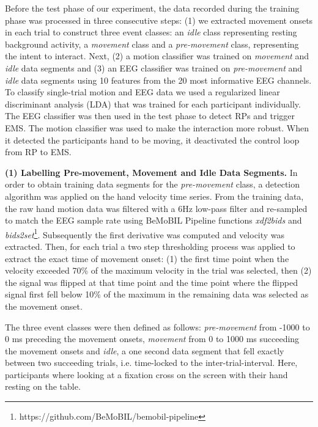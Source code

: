 Before the test phase of our experiment, the data recorded during the training phase was processed in three consecutive steps: (1) we extracted movement onsets in each trial to construct three event classes: an \textit{idle} class representing resting background activity, a \textit{movement} class and a \textit{pre-movement} class, representing the intent to interact. Next, (2) a motion classifier was trained on \textit{movement} and \textit{idle} data segments and (3) an EEG classifier was trained on \textit{pre-movement} and \textit{idle} data segments using 10 features from the 20 most informative EEG channels. To classify single-trial motion and EEG data we used a regularized linear discriminant analysis (LDA) that was trained for each participant individually. The EEG classifier was then used in the test phase to detect RPs and trigger EMS. The motion classifier was used to make the interaction more robust. When it detected the participants hand to be moving, it deactivated the control loop from RP to EMS.


\indent\textbf{(1) Labelling Pre-movement, Movement and Idle Data Segments.}
In order to obtain training data segments for the \textit{pre-movement} class, a detection algorithm was applied on the hand velocity time series. From the training data, the raw hand motion data was filtered with a 6Hz low-pass filter and re-sampled to match the EEG sample rate using BeMoBIL Pipeline functions \textit{xdf2bids} and \textit{bids2set}\footnote{https://github.com/BeMoBIL/bemobil-pipeline}. Subsequently the first derivative was computed and velocity was extracted. Then, for each trial a two step thresholding process was applied to extract the exact time of movement onset: (1) the first time point when the velocity exceeded 70\% of the maximum velocity in the trial was selected, then (2) the signal was flipped at that time point and the time point where the flipped signal first fell below 10\% of the maximum in the remaining data was selected as the movement onset.

The three event classes were then defined as follows: \textit{pre-movement} from -1000 to 0 ms preceding the movement onsets, \textit{movement} from 0 to 1000 ms succeeding the movement onsets and \textit{idle}, a one second data segment that fell exactly between two succeeding trials, i.e. time-locked to the inter-trial-interval. Here, participants where looking at a fixation cross on the screen with their hand resting on the table.

